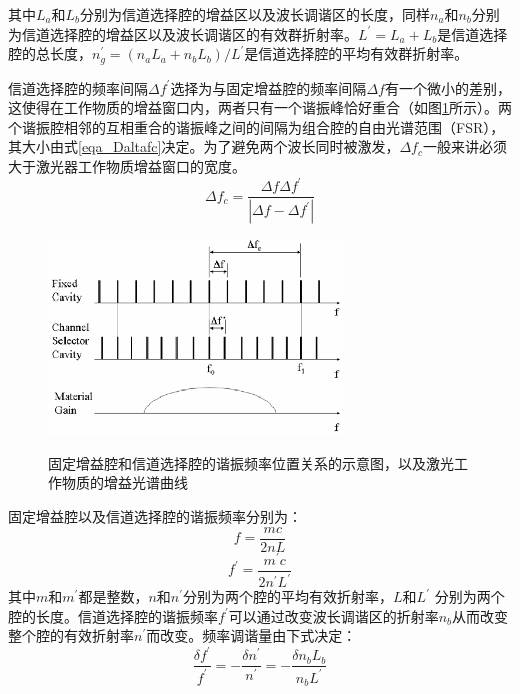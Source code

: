 \documentclass{ZJUthesis}
\begin{document}
其中$L_a$和$L_b$分别为信道选择腔的增益区以及波长调谐区的长度，同样$n_a$和$n_b$分别为信道选择腔的增益区以及波长调谐区的有效群折射率。$L^\prime=L_a+L_b$是信道选择腔的总长度，$n_g^\prime=(n_a L_a + n_b L_b)/L^\prime$是信道选择腔的平均有效群折射率。

信道选择腔的频率间隔$\Delta f ^\prime$选择为与固定增益腔的频率间隔$\Delta f$有一个微小的差别，这使得在工作物质的增益窗口内，两者只有一个谐振峰恰好重合（如图\ref{fig_Deltaf}所示）。两个谐振腔相邻的互相重合的谐振峰之间的间隔为组合腔的自由光谱范围（FSR），其大小由式\ref{eqa_Daltafc}决定。为了避免两个波长同时被激发，$\Delta f_c$一般来讲必须大于激光器工作物质增益窗口的宽度。
\begin{equation}\label{eqa_Daltafc}
  \Delta f_c = \frac{\Delta f \Delta f^\prime}{|\Delta f-\Delta f^\prime|}
\end{equation}
\begin{figure}[htb]
  \centering
  \includegraphics[width=0.7\textwidth]{./Pictures/deltaf.eps}\\
  \caption{固定增益腔和信道选择腔的谐振频率位置关系的示意图，以及激光工作物质的增益光谱曲线}\label{fig_Deltaf}
\end{figure}

固定增益腔以及信道选择腔的谐振频率分别为：
\begin{equation}
  f = \frac{mc}{2nL}
\end{equation}
\begin{equation}
  f^\prime = \frac{m^\prime c}{2n^\prime L^\prime}
\end{equation}
其中$m$和$m^\prime$都是整数，$n$和$n^\prime$分别为两个腔的平均有效折射率，$L$和$L^\prime$ 分别为两个腔的长度。信道选择腔的谐振频率$f^\prime$可以通过改变波长调谐区的折射率$n_b$从而改变整个腔的有效折射率$n^\prime$而改变。频率调谐量由下式决定：
\begin{equation}
  \frac{\delta f^\prime}{f^\prime} = -\frac{\delta n^\prime}{n^\prime}=-\frac{\delta n_b L_b}{n_b L^\prime}
\end{equation}
\end{document}
